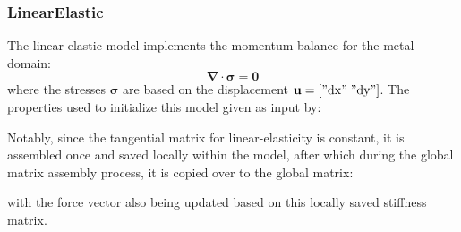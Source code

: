 \documentclass[3p]{elsarticle} %
\begin{document}
\subsubsection{LinearElastic}
The linear-elastic model implements the momentum balance for the metal domain:
\begin{equation}
	\bm{\nabla}\cdot\bm{\sigma} = \mathbf{0}
\end{equation}
where the stresses $\bm{\sigma}$ are based on the displacement $\mathbf{u}=["\mathrm{dx}"\;"\mathrm{dy}"]$. The properties used to initialize this model given as input by:

Notably, since the tangential matrix for linear-elasticity is constant, it is assembled once and saved locally within the model, after which during the global matrix assembly process, it is copied over to the global matrix:

with the force vector also being updated based on this locally saved stiffness matrix. 
\end{document}
